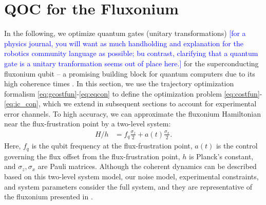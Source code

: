 \section{QOC for the Fluxonium \label{sec:fluxonium}}
In the following, we optimize quantum gates
(unitary transformations) \textcolor{blue}{[for a physics journal, you will want as much handholding and explanation for the robotics community language as possible; bu contrast, clarifying that a quantum gate is a unitary tranformation seems out of place here.]} for the superconducting fluxonium qubit -- a promising
building block for quantum computers due to its high
coherence times
\cite{earnest2018realization, lin2018demonstration,
  manucharyan2009fluxonium, nguyen2019high,
  zhang2020universal}.
In this section, we use the trajectory optimization
formalism \eqref{eq:gcostfun}-\eqref{eq:eqcon}
to define the optimization problem \eqref{eq:costfun}-\eqref{eq:ic_con},
which we extend in subsequent sections to account
for experimental error channels.
To high accuracy, we can approximate the fluxonium Hamiltonian near the flux-frustration
point by a two-level system:
\begin{align}
  H/h &= f_{q} \frac{\sigma_{z}}{2} + a(t) \frac{\sigma_{x}}{2}.
  \label{eq:hamiltonian}
\end{align}
Here, $f_{q}$ is the qubit frequency at the flux-frustration point,
$a(t)$ is the control governing the flux offset from the flux-frustration point,
$h$ is Planck's constant, and $\sigma_{z}, \sigma_{x}$
are Pauli matrices. Although the coherent dynamics can be described based on this two-level
system model, our noise model, experimental constraints, and system parameters
consider the full system, and they are representative of the fluxonium
presented in \cite{zhang2020universal}.

